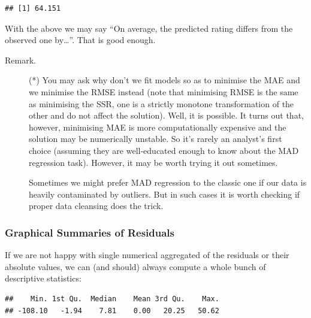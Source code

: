 \documentclass[10pt,b5paper,krantz1]{krantz}
\newenvironment{Shaded}{\begin{snugshade}}{\end{snugshade}}
\newcommand{\KeywordTok}[1]{\textcolor[rgb]{0.27,0.27,0.27}{\textbf{#1}}}
\newcommand{\NormalTok}[1]{#1}
\newcommand{\OperatorTok}[1]{\textcolor[rgb]{0.43,0.43,0.43}{\textbf{#1}}}
\begin{document}
\begin{verbatim}
## [1] 64.151
\end{verbatim}

With the above we may say ``On average, the predicted rating differs from the
observed one by\ldots{}''. That is good enough.

\begin{description}
\item[Remark.]
(*) You may ask why don't we fit models so as to minimise the MAE
and we minimise the RMSE instead (note that minimising RMSE is the same as
minimising the SSR, one is a strictly monotone transformation of the other
and do not affect the solution). Well, it is possible.
It turns out that, however, minimising MAE is more computationally expensive
and the solution may be numerically unstable.
So it's rarely an analyst's first choice (assuming they are well-educated
enough to know about the MAD regression task). However, it may be worth
trying it out sometimes.

Sometimes we might prefer MAD regression to the classic one
if our data is heavily contaminated by outliers. But
in such cases it is worth checking if proper data cleansing does
the trick.
\end{description}

\hypertarget{graphical-summaries-of-residuals}{%
\subsubsection{Graphical Summaries of Residuals}\label{graphical-summaries-of-residuals}}

If we are not happy with single numerical aggregated of the residuals
or their absolute values, we can (and should) always compute a whole
bunch of descriptive statistics:

\begin{Shaded}
\end{Shaded}

\begin{verbatim}
##    Min. 1st Qu.  Median    Mean 3rd Qu.    Max. 
## -108.10   -1.94    7.81    0.00   20.25   50.62
\end{verbatim}

\begin{Shaded}
\end{Shaded}
\end{document}
